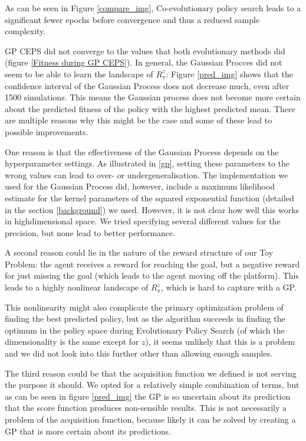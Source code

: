 
As can be seen in Figure \ref{compare_img}, Co-evolutionary policy search leads to a significant fewer epochs before convergence and thus a reduced sample complexity. 

GP CEPS did not converge to the values that both evolutionary methods did (figure \ref{Fitness during GP CEPS}). In general, the Gaussian Procces did not seem to be able to learn the landscape of $R_{\pi}^z$: Figure \ref{pred_img} shows that the confidence interval of the Gaussian Process does not decrease much, even after 1500 simulations. This means the Gaussian process does not become more certain about the predicted fitness of the policy with the highest predicted mean.
There are multiple reasons why this might be the case and some of these lead to possible improvements. 

One reason is that the effectiveness of the Gaussian Process depends on the hyperparameter settings. As illustrated in \ref{gp}, setting these parameters to the wrong values can lead to over- or undergeneralisation. The implementation we used for the Gaussian Process did, however, include a maximum likelihood estimate for the kernel parameters of the squared exponential function (detailed in the section \ref{background}) we used. However, it is not clear how well this works in highdimensional space. We tried specifying several different values for the precision, but none lead to better performance. 

A second reason could lie in the nature of the reward structure of our Toy Problem: the agent receives a reward for reaching the goal, but a negative reward for just missing the goal (which leads to the agent moving off the platform). This leads to a highly nonlinear landscape of $R_{\pi}^z$, which is hard to capture with a GP. 

This nonlinearity might also complicate the primary optimization problem of finding the best predicted policy, but as the algorithm succeeds in finding the optimum in the policy space during Evolutionary Policy Search (of which the dimensionality is the same except for $z$), it seems unlikely that this is a problem and we did not look into this further other than allowing enough samples.

The third reason could be that the acquisition function we defined is not serving the purpose it should. We opted for a relatively simple combination of terms, but as can be seen in figure \ref{pred_img} the GP is so uncertain about its prediction that the score function produces non-sensible results. This is not necessarily a problem of the acquisition function, because likely it can be solved by creating a GP that is more certain about its predictions.


